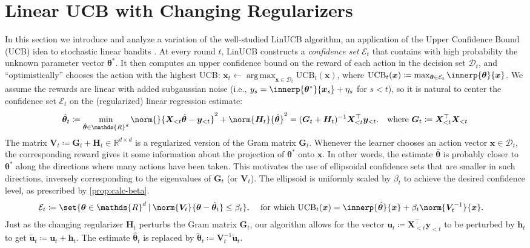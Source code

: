 \documentclass{article}
\renewcommand{\vec}[1]{\bm{#1}}
\newcommand{\defeq}{\coloneq}
\newcommand{\inv}[1]{#1^{-1}}
\newcommand{\Real}{\mathds{R}}
\newcommand{\UCB}{\mathrm{UCB}}
\newcommand{\argmax}{\operatorname*{arg\,max}}
\newcommand\given[1][\delimsize]{%
  \providecommand{\delimsize}{}
  \nonscript\:#1\vert\allowbreak\nonscript\:\mathopen{}
}
\newcommand{\D}{\mathcal{D}}
\newcommand{\E}{\mathcal{E}}
\providecommand\transp{\top}
\let\transpsymbol\transp
\renewcommand{\transp}[1]{#1^\transpsymbol}
\newcommand{\XtX}[1]{\transp{#1}{#1}}
\begin{document}
\section{Linear UCB with Changing Regularizers}
\label{sec:LinUCB}

In this section we introduce and analyze a variation of
the well-studied LinUCB algorithm, an application of the Upper
Confidence Bound (UCB) idea to stochastic linear bandits
\citep{DaniStochasticLinearOptimization2008,RusmevichientongLinearlyParameterizedBandits2010,AbbasiYadkoriImprovedAlgorithmsLinear2011}.
At every round $t$, LinUCB constructs a \emph{confidence set} $\E_t$
that contains  with high probability the unknown parameter vector $\vec\theta^*$.  It then computes an upper confidence bound on the reward
of each action in the decision set $\D_t$, and ``optimistically''
chooses the action with the highest UCB:
$\vec x_t \gets \argmax_{\vec x\in\D_t} \UCB_t(\vec x)$, where
$\UCB_t(\vec x) \defeq \max_{\vec\theta\in\E_t}
\innerp{\vec\theta}{\vec x}$.  We assume the rewards are linear with
added subgaussian noise (i.e.,
$y_s = \innerp{\vec\theta^*}{\vec x_s} + \eta_s$ for $s<t$), so it is
natural to center the confidence set $\E_t$ on the (regularized)
linear regression estimate:
\begin{align*}
  \hat{\vec\theta}_t
  &\defeq \min_{\hat{\vec\theta} \in \Real^d} \norm{}{\vec X_{<t} \hat{\vec\theta}
    - \vec y_{<t}}^2 + \norm{\vec H_t}{\hat{\vec\theta}}^2
    = \inv{(\vec G_t + \vec H_t)} \transp{\vec X_{<t}} \vec y_{<t}.
    &\text{where } \vec G_t \defeq \XtX{\vec X_{<t}}
\end{align*}
The matrix $\vec V_t \defeq \vec G_t + \vec H_t \in \Real^{d\times d}$ is a regularized
version of the Gram matrix $\vec G_t$.  Whenever the learner chooses an
action vector $\vec x\in \D_t$, the corresponding reward gives it some information
about the projection of $\vec\theta^*$ onto $\vec x$.  In other
words, the estimate $\hat{\vec\theta}$ is probably closer to
$\vec\theta^*$ along the directions where many actions have
been taken.  This motivates the use of ellipsoidal confidence sets
that are smaller in such directions, inversely
corresponding to the eigenvalues of $\vec G_t$ (or $\vec V_t$). The ellipsoid
is uniformly scaled by $\beta_t$ to achieve the desired confidence
level, as prescribed by \cref{prop:calc-beta}.
\begin{align}\label{eq:def-ellip}
  \E_t &\defeq \set{\vec\theta\in\Real^d \given
        \norm{\vec V_t}{\vec\theta-\hat{\vec\theta}_t} \le \beta_t},
  &\text{ for which }
    \UCB_t(\vec x) &= \innerp{\hat{\vec\theta}}{\vec x} + \beta_t\norm{\inv{\vec V_t}}{\vec x}.
\end{align}
Just as the changing regularizer $\vec H_t$ perturbs the Gram matrix $\vec G_t$,
our algorithm allows for the vector
$\vec u_t \defeq \transp{\vec X_{<t}} \vec y_{<t}$ to be perturbed
by $\vec h_t$ to get
$\tilde{\vec u}_t \defeq \vec u_t + \vec h_t$.  The estimate
$\hat{\vec\theta}_t$ is replaced by
$\tilde{\vec\theta}_t \defeq \inv{\vec V_t}\tilde{\vec u}_t$.
\end{document}
